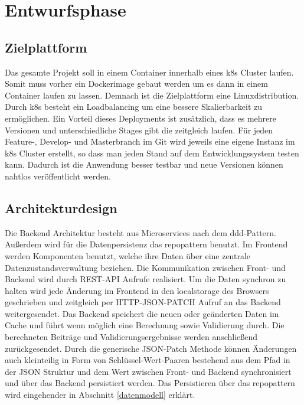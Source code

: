 \section{Entwurfsphase}
\label{entwurfsphase}
\subsection{Zielplattform}
\label{zielplattform}
Das gesamte Projekt soll in einem \gls{Container} innerhalb eines \gls{k8s} Cluster laufen. Somit muss vorher ein Dockerimage gebaut werden um es dann in einem Container laufen zu lassen. Demnach ist die Zielplattform eine Linuxdistribution. Durch \gls{k8s} besteht ein Loadbalancing um eine bessere Skalierbarkeit zu ermöglichen. Ein Vorteil dieses Deployments ist zusätzlich, dass es mehrere Versionen und unterschiedliche Stages gibt die zeitgleich laufen. Für jeden Feature-, Develop- und Masterbranch im Git wird jeweils eine eigene Instanz im \gls{k8s} Cluster erstellt, so dass man jeden Stand auf dem Entwicklungssystem testen kann. Dadurch ist die Anwendung besser testbar und neue Versionen können nahtlos veröffentlicht werden.
\subsection{Architekturdesign}
\label{architekturdesign}
Die Backend Architektur besteht aus Microservices nach dem \gls{ddd}-Pattern. Außerdem wird für die Datenpersistenz das \gls{repopattern} benutzt. Im Frontend werden Komponenten benutzt, welche ihre Daten über eine zentrale Datenzustandsverwaltung beziehen. Die Kommunikation zwischen Front- und Backend wird durch REST-API Aufrufe realisiert. Um die Daten synchron zu halten wird jede Änderung im Frontend in den \gls{localstorage} des Browsers geschrieben und zeitgleich per HTTP-JSON-PATCH Aufruf an das Backend weitergesendet. Das Backend speichert die neuen oder geänderten Daten im Cache und führt wenn möglich eine Berechnung sowie Validierung durch. Die berechneten Beiträge und Validierungsergebnisse werden anschließend zurückgesendet. Durch die generische JSON-Patch Methode können Änderungen auch kleinteilig in Form von Schlüssel-Wert-Paaren bestehend aus dem Pfad in der JSON Struktur und dem Wert zwischen Front- und Backend synchronisiert und über das Backend persistiert werden. Das Persistieren über das \gls{repopattern} wird eingehender in Abschnitt \ref{datenmodell}  erklärt.
